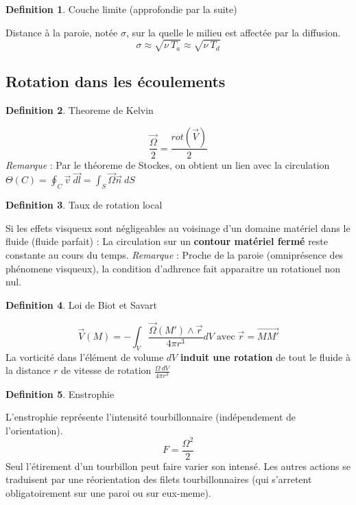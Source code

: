 \documentclass[french]{article}
\theoremstyle{definition}
\newtheorem{definition}{Definition}[section]
\begin{document}
\begin{definition} Couche limite (approfondie par la suite) \par
	Distance à la paroie, notée $\sigma$, sur la quelle le milieu est affectée par la diffusion. 
	$$ \sigma \approx \sqrt{\nu \ T_a } \approx \sqrt{\nu \ T_d }$$ 
\end{definition}


\subsection{Rotation dans les écoulements}

\begin{definition} Theoreme de Kelvin \par
	$$ \frac{\vec{\Omega}}{2} = \frac{rot(\vec{V})}{2} $$
	\textit{Remarque} : Par le théoreme de Stockes, on obtient un lien avec la circulation
	$ \Theta(C) = \oint_C \vec{v} \ \vec{dl} = \int_S \vec{\Omega} \vec{n} \ dS$
\end{definition}


\begin{definition} Taux de rotation local \par
	Si les effets visqueux sont négligeables au voisinage d'un domaine matériel dans le fluide (fluide parfait) :
	La circulation sur un \textbf{contour matériel fermé} reste constante au cours du temps.
	\textit{Remarque} : Proche de la paroie (omniprésence des phénomene visqueux), la condition d'adhrence fait apparaitre un rotationel non nul.
\end{definition}

\begin{definition} Loi de Biot et Savart \par
	$$ \vec{V}(M) = - \int_V \frac{\vec{\Omega}(M') \wedge \vec{r}}{4 \pi r^3} dV \; \mbox{avec} \; \vec{r} = \vec{MM'} $$
	La vorticité dans l'élément de volume $dV$ \textbf{induit une rotation} de tout le fluide à la distance $r$ de vitesse de rotation $ \frac{\Omega \ dV}{4\pi r^3}$
\end{definition}

\begin{definition} Enstrophie \par
	L'enstrophie représente l'intensité tourbillonnaire (indépendement de l'orientation).
	$$ F = \frac{\Omega ^2}{2}  $$
	Seul l'étirement d'un tourbillon peut faire varier son intensé. Les autres actions se traduisent par une réorientation des filets tourbillonnaires (qui s'arretent obligatoirement sur une paroi ou sur eux-meme).
\end{definition}
\end{document}
